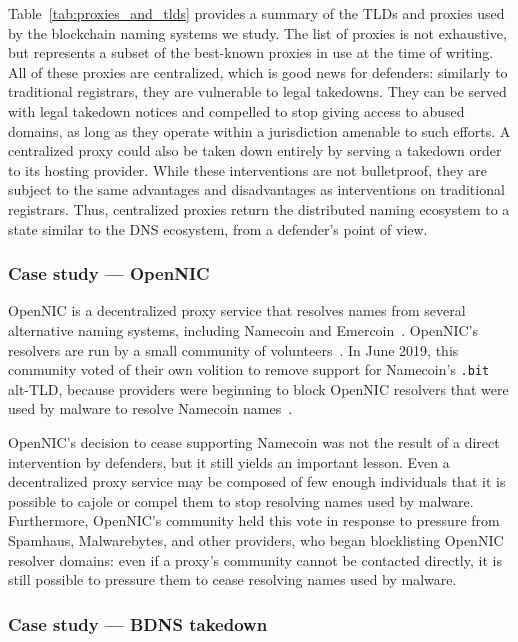 Table~\ref{tab:proxies_and_tlds} provides a summary of the TLDs and 
proxies 
used by the blockchain naming systems we study. The list of proxies is not 
exhaustive, but 
represents 
a subset of the best-known proxies in use at the time of writing.
All of these proxies are 
centralized, which is good news for defenders: similarly to traditional 
registrars, they are vulnerable to legal takedowns. They can be served with 
legal takedown notices and compelled to stop giving access to abused domains, 
as long as they 
operate within a jurisdiction amenable to such efforts. A centralized proxy 
could also be taken 
down entirely by serving a takedown order to its hosting provider. While 
these interventions are 
not bulletproof, they are subject to the same advantages and disadvantages 
as 
interventions on traditional registrars. Thus, centralized proxies return 
the 
distributed naming ecosystem to a state similar to the DNS ecosystem, from a 
defender's point of view. 

\subsubsection{Case study --- OpenNIC}

OpenNIC is a decentralized proxy service that 
resolves names from several alternative naming systems, 
including Namecoin and Emercoin~\cite{opennic}. OpenNIC's 
resolvers are run by a small community of 
volunteers~\cite{opennic_servers}. In June 2019, this 
community voted of their own volition to remove support for 
Namecoin's \texttt{.bit} alt-TLD, because providers were 
beginning to block OpenNIC resolvers that were used by 
malware to resolve Namecoin 
names~\cite{opennic_namecoin_vote}.

OpenNIC's decision to cease supporting Namecoin was not the 
result of a direct intervention by defenders, but it still 
yields an important lesson. Even a decentralized proxy 
service may be composed of few enough individuals that it is 
possible to cajole or compel them to stop resolving names 
used by malware. Furthermore, OpenNIC's community held this 
vote in response to pressure from Spamhaus, Malwarebytes, and 
other providers, who began blocklisting OpenNIC resolver 
domains: even if a proxy's community cannot be contacted 
directly, it is still possible to pressure them to cease 
resolving names used by malware.

\subsubsection{Case study --- BDNS takedown}

